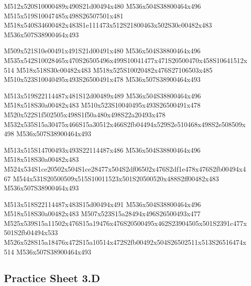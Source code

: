 \documentclass{article}
\begin{document}
\begin{multicols}{5}
\begin{center}
M512x520S10000489x490S21d00494x480 %
M536x504S38800464x496 %
M515x519S10047485x498S26507501x481 %
M518x540S34600482x483S1e111473x512S21800463x502S30c00482x483 %
M536x507S38900464x493 %
\vfil
\columnbreak

M509x521S10e00491x491S21d00491x480 %
M536x504S38800464x496 %
M535x542S10028465x470S26505496x499S10041477x471S20500470x458S10641512x514 %
M518x518S30c00482x483 %
M518x525S10020482x476S27106503x485 %
M510x523S10040495x493S26500491x478 %
M536x507S38900464x493 %
\vfil
\columnbreak

M513x519S22114487x481S12d00489x489 %
M536x504S38800464x496 %
M518x518S30a00482x483 %
M510x523S10040495x493S26500491x478 %
M520x522S1f502505x498S1f50a480x498S22a20493x478 %
M532x535S15a30475x466S15a30512x466S2fb04494x529S2e510468x498S2e508509x498 %
M536x507S38900464x493 %
\vfil
\columnbreak

M513x515S14700493x493S22114487x486 %
M536x504S38800464x496 %
M518x518S30a00482x483 %
M524x534S1ce20502x504S1ce28477x504S2df06502x476S2df1e478x476S2fb00494x467 %
M544x531S20500509x515S10011523x501S20500520x488S2ff00482x483 %
M536x507S38900464x493 %
\vfil
\columnbreak

M513x518S22114487x483S15d00494x491 %
M536x504S38800464x496 %
M518x518S30a00482x483 %
M507x523S15a28494x496S26500493x477 %
M525x539S15a11502x476S15a19476x476S20500495x462S23904505x501S2391c477x501S2fb04494x533 %
M526x528S15a18476x472S15a10514x472S2fb00492x504S26502511x513S26516474x514 %
M536x507S38900464x493 %
\vfil

\end{center}
\end{multicols}

\subsection{Practice Sheet 3.D}
\end{document}
